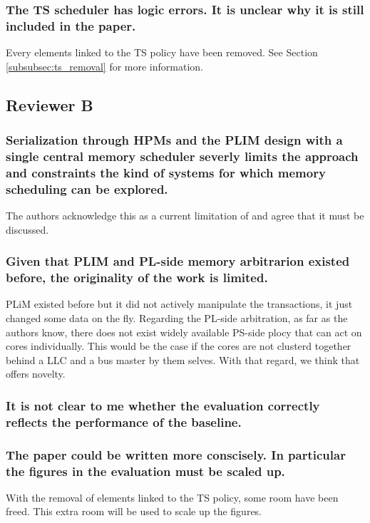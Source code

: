         \subsubsection{The TS scheduler has logic errors. It is unclear why it is still included in the paper.}
            Every elements linked to the TS policy have been removed. See Section \ref{subsubsec:ts_removal} for more information.

    \subsection{Reviewer B}
        \subsubsection{Serialization through HPMs and the PLIM design with a single central memory scheduler severly limits the approach and constraints the kind of systems for which memory scheduling can be explored.}
            The authors acknowledge this as a current limitation of \schim and agree that it must be discussed.

        \subsubsection{Given that PLIM and PL-side memory arbitrarion existed before, the originality of the work is limited.}
            PLiM existed before but it did not actively manipulate the transactions, it just changed some data on the fly. Regarding the PL-side arbitration, as far as the authors know, there does not exist widely available PS-side plocy that can act on cores individually. This would be the case if the cores are not clusterd together behind a LLC and a bus master by them selves. With that regard, we think that \schim offers novelty.

        \subsubsection{It is not clear to me whether the evaluation correctly reflects the performance of the baseline.}


        \subsubsection{The paper could be written more conscisely. In particular the figures in the evaluation must be scaled up.}
            With the removal of elements linked to the TS policy, some room have been freed. This extra room will be used to scale up the figures.


